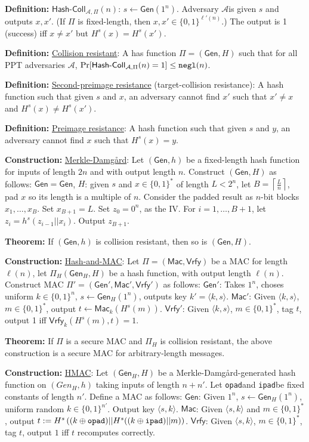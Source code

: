 \documentclass[10pt]{article}
\newcommand{\AAA}{\mathcal{A}}
\newcommand{\defn}[1]{{\bf Definition:} \underline{#1}}
\newcommand{\thm}[1]{{\bf Theorem:} \underline{#1}}
\newcommand{\con}[1]{{\bf Construction:} \underline{#1}}
\newcommand{\Mac}{\mathsf{Mac}}
\newcommand{\Vrfy}{\mathsf{Vrfy}}
\newcommand{\Gen}{\mathsf{Gen}}
\newcommand{\ang}[1]{\langle#1\rangle}
\newcommand{\ExptHCArgs}[2]{\mathsf{Hash\text{-}Coll}_{#1,#2}}
\newcommand{\ExptHC}{\ExptHCArgs{\AAA}{\Pi}}
\newcommand{\xor}{\oplus}
\newcommand{\negl}{{\tt negl}}
\newcommand{\opad}{{\tt opad}}
\newcommand{\ipad}{{\tt ipad}}
\newcommand{\from}{\leftarrow}
\begin{document}
\begin{multicols}{4}
\defn{$\ExptHC(n)$}: $s\from\Gen(1^n)$. Adversary $\AAA$is given $s$ and outputs $x,x'$. (If $\Pi$ is fixed-length, then $x,x'\in\{0,1\}^{\ell'(n)}$.) The output is 1 (success) iff $x\neq x'$ but $H^s(x)=H^s(x')$.

\defn{Collision resistant}: A has function $\Pi=(\Gen, H)$ such that for all PPT adversaries $\AAA$, $\Pr[\ExptHC(n)=1]\leq\negl(n)$.

\defn{Second-preimage resistance} (target-collision resistance): A hash function such that given $s$ and $x$, an adversary cannot find $x'$ such that $x'\neq x$ and $H^s(x)\neq H^s(x')$.

\defn{Preimage resistance}: A hash function such that given $s$ and $y$, an adversary cannot find $x$ such that $H^s(x)=y$.

\con{Merkle-Damg\r{a}rd}: Let $(\Gen, h)$ be a fixed-length hash function for inputs of length $2n$ and with output length $n$. Construct $(\Gen, H)$ as follows: $\Gen=\Gen$, $H$: given $s$ and $x\in\{0,1\}^*$ of length $L<2^n$, let $B=\left\lceil\frac{L}{n}\right\rceil$, pad $x$ so its length is a multiple of $n$. Consider the padded result as $n$-bit blocks $x_1, \dots,x_B$. Set $x_{B+1}=L$. Set $z_0=0^n$, as the IV. For $i=1,\dots,B+1$, let $z_i=h^s(z_{i-1}||x_i)$. Output $z_{B+1}$.

\thm{}If $(\Gen, h)$ is collision resistant, then so is $(\Gen, H)$.

\con{Hash-and-MAC}: Let $\Pi=(\Mac,\Vrfy)$ be a MAC for length $\ell(n)$, let $\Pi_{H}(\Gen_H,H)$ be a hash function, with output length $\ell(n)$. Construct MAC $\Pi'=(\Gen',\Mac',\Vrfy')$ as follows: $\Gen'$: Takes $1^n$, choses uniform $k\in\{0,1\}^n$, $s\from\Gen_H(1^n)$, outputs key $k'=\ang{k,s}$. $\Mac'$: Given $\ang{k,s}$, $m\in\{0,1\}^*$, output $t\from\Mac_k(H^s(m))$. $\Vrfy'$: Given $\ang{k,s}$, $m\in\{0,1\}^*$, tag $t$, output 1 iff $\Vrfy_k(H^s(m),t)=1$.

\thm{}If $\Pi$ is a secure MAC and $\Pi_H$ is collision resistant, the above construction is a secure MAC for arbitrary-length messages.

\con{HMAC}: Let $(\Gen_H,H)$ be a Merkle-Damg\r{a}rd-generated hash function on $(Gen_H,h)$ taking inputs of length $n+n'$. Let \opad and \ipad be fixed constants of length $n'$. Define a MAC as follows: $\Gen$: Given $1^n$, $s\from\Gen_H(1^n)$, uniform random $k\in\{0,1\}^{n'}$. Output key $\ang{s,k}$. $\Mac$: Given $\ang{s,k}$ and $m\in\{0,1\}^*$, output $t:=H^s\left((k\xor\opad)||H^s((k\xor\ipad)||m)\right)$. $\Vrfy$: Given $\ang{s,k}$, $m\in\{0,1\}^*$, tag $t$, output $1$ iff $t$ recomputes correctly.


\end{multicols}
\end{document}
